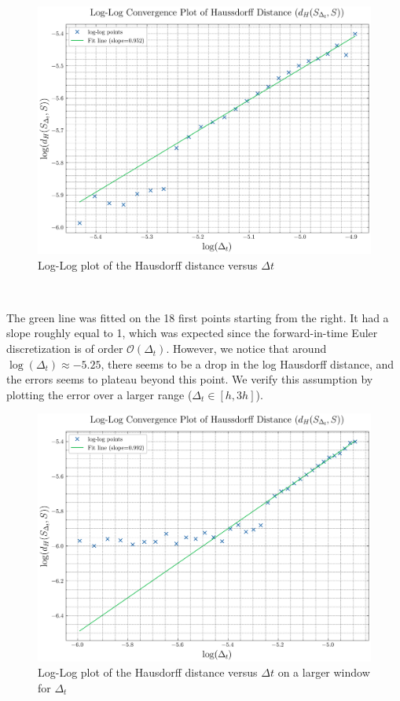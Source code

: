 \documentclass[11pt]{article}
\theoremstyle{definition}
\theoremstyle{remark}
\begin{document}
\begin{figure}[h]
  \centering
  \includegraphics[width=0.7\linewidth]{plots/loglog_plot_convergence_path.png}
  \caption{Log-Log plot of the Hausdorff distance versus $\Delta t$}
  \label{fig:loglog_conv_hausdorff}
\end{figure} \\

\FloatBarrier

\noindent The green line was fitted on the 18 first points starting from the right. It had a slope roughly equal to 1, which was expected since the forward-in-time Euler discretization is of order $\mathcal{O}(\Delta_t)$. However, we notice that around $\log(\Delta_t)\approx-5.25$, there seems to be a drop in the log Hausdorff distance, and the errors seems to plateau beyond this point. We verify this assumption by plotting the error over a larger range ($\Delta_t\in[h,3h]$). \\

\begin{figure}[h!]
  \centering
  \includegraphics[width=0.7\linewidth]{plots/loglog_plot_convergence_path_larger_window.png}
  \caption{Log-Log plot of the Hausdorff distance versus $\Delta t$ on a larger window for $\Delta
  _t$}
  \label{fig:loglog_conv_hausdorff}
\end{figure} 
\end{document}

